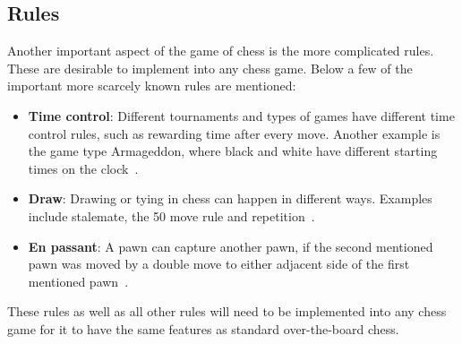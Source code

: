 
\subsection{Rules}\label{subsec:rules}

Another important aspect of the game of chess is the more complicated rules.
These are desirable to implement into any chess game.
Below a few of the important more scarcely known rules are mentioned:

\begin{itemize}
    \item \textbf{Time control}: Different tournaments and types of games have different time control rules, such as
    rewarding time after every move.
    Another example is the game type Armageddon, where black and white have different starting times on the
    clock~\cite{schiller2012}.
    \item \textbf{Draw}: Drawing or tying in chess can happen in different ways.
    Examples include stalemate, the 50 move rule and repetition~\cite{schiller2012}.
    \item \textbf{En passant}: A pawn can capture another pawn, if the second mentioned pawn was moved by a double move
    to either adjacent side of the first mentioned pawn~\cite{schiller2012}.
\end{itemize}

These rules as well as all other rules will need to be implemented into any chess game for it to have the same features
as standard over-the-board chess.
